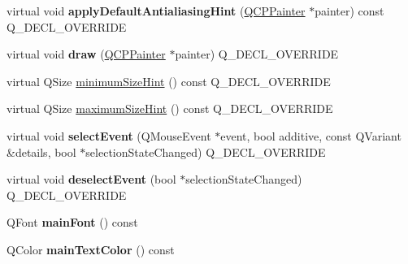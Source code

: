 \begin{DoxyCompactItemize}
\item 
virtual void {\bfseries apply\+Default\+Antialiasing\+Hint} (\hyperlink{class_q_c_p_painter}{Q\+C\+P\+Painter} $\ast$painter) const Q\+\_\+\+D\+E\+C\+L\+\_\+\+O\+V\+E\+R\+R\+I\+DE\hypertarget{class_q_c_p_text_element_ae9ab69dcb7bb2b13e9128c20748f668d}{}\label{class_q_c_p_text_element_ae9ab69dcb7bb2b13e9128c20748f668d}

\item 
virtual void {\bfseries draw} (\hyperlink{class_q_c_p_painter}{Q\+C\+P\+Painter} $\ast$painter) Q\+\_\+\+D\+E\+C\+L\+\_\+\+O\+V\+E\+R\+R\+I\+DE\hypertarget{class_q_c_p_text_element_a6217f76da5c4dea768e40627ab242973}{}\label{class_q_c_p_text_element_a6217f76da5c4dea768e40627ab242973}

\item 
virtual Q\+Size \hyperlink{class_q_c_p_text_element_a28c1113007c8990bf2c1a235b24381ef}{minimum\+Size\+Hint} () const Q\+\_\+\+D\+E\+C\+L\+\_\+\+O\+V\+E\+R\+R\+I\+DE
\item 
virtual Q\+Size \hyperlink{class_q_c_p_text_element_a174551b248c8960d1b250bbe04e1b20c}{maximum\+Size\+Hint} () const Q\+\_\+\+D\+E\+C\+L\+\_\+\+O\+V\+E\+R\+R\+I\+DE
\item 
virtual void {\bfseries select\+Event} (Q\+Mouse\+Event $\ast$event, bool additive, const Q\+Variant \&details, bool $\ast$selection\+State\+Changed) Q\+\_\+\+D\+E\+C\+L\+\_\+\+O\+V\+E\+R\+R\+I\+DE\hypertarget{class_q_c_p_text_element_a281e7b84450205c1a1d2a741cde91677}{}\label{class_q_c_p_text_element_a281e7b84450205c1a1d2a741cde91677}

\item 
virtual void {\bfseries deselect\+Event} (bool $\ast$selection\+State\+Changed) Q\+\_\+\+D\+E\+C\+L\+\_\+\+O\+V\+E\+R\+R\+I\+DE\hypertarget{class_q_c_p_text_element_aef3ac95fabd9475abcc9d9f25516fe23}{}\label{class_q_c_p_text_element_aef3ac95fabd9475abcc9d9f25516fe23}

\item 
Q\+Font {\bfseries main\+Font} () const \hypertarget{class_q_c_p_text_element_add703a8b26d42bfe2378c3f51dd5c9ce}{}\label{class_q_c_p_text_element_add703a8b26d42bfe2378c3f51dd5c9ce}

\item 
Q\+Color {\bfseries main\+Text\+Color} () const \hypertarget{class_q_c_p_text_element_aed22b0d84634c10d81da006956ef5abb}{}\label{class_q_c_p_text_element_aed22b0d84634c10d81da006956ef5abb}

\end{DoxyCompactItemize}
